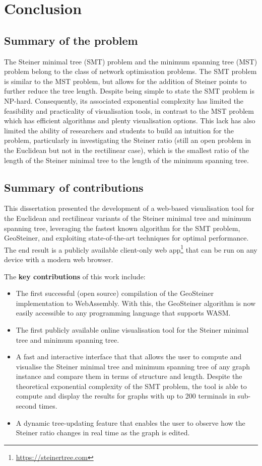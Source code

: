 \documentclass{l4proj}
\begin{document}
\chapter{Conclusion}
\label{sec:conclusion}
\section{Summary of the problem}
The Steiner minimal tree (SMT) problem and the minimum spanning tree (MST) problem belong to the class of network optimisation problems. The SMT problem is similar to the MST problem, but allows for the addition of Steiner points to further reduce the tree length.
Despite being simple to state the SMT problem is NP-hard. Consequently, its associated exponential complexity has limited the feasibility and practicality of visualisation tools, in contrast to the MST problem which has efficient algorithms and plenty visualisation options. This lack has also limited the ability of researchers and students to build an intuition for the problem, particularly in investigating the Steiner ratio (still an open problem in the Euclidean but not in the rectilinear case), which is the smallest ratio of the length of the Steiner minimal tree to the length of the minimum spanning tree.

\section{Summary of contributions}
This dissertation presented the development of a web-based visualisation tool for the Euclidean and rectilinear variants of the Steiner minimal tree and minimum spanning tree, leveraging the fastest known algorithm for the SMT problem, GeoSteiner, and exploiting state-of-the-art techniques for optimal performance.
The end result is a publicly available client-only web app\footnote{\url{https://steinertree.com}} that can be run on any device with a modern web browser.

The \textbf{key contributions} of this work include:
\begin{itemize}
    \item The first successful (open source) compilation of the GeoSteiner implementation to WebAssembly. With this, the GeoSteiner algorithm is now easily accessible to any programming language that supports WASM.
    \item The first publicly available online visualisation tool for the Steiner minimal tree and minimum spanning tree.
    \item A fast and interactive interface that that allows the user to compute and visualise the Steiner minimal tree and minimum spanning tree of any graph instance and compare them in terms of structure and length. Despite the theoretical exponential complexity of the SMT problem, the tool is able to compute and display the results for graphs with up to 200 terminals in sub-second times.
    \item A dynamic tree-updating feature that enables the user to observe how the Steiner ratio changes in real time as the graph is edited.
\end{itemize}
\end{document}
